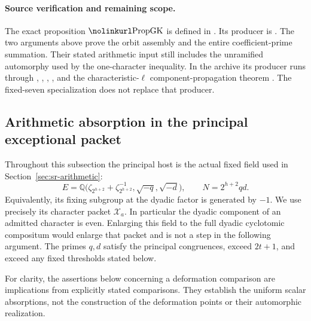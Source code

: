 \paragraph{Source verification and remaining scope.}
The exact proposition $\srcid{PropGK}$ is defined in
\href{https://github.com/ChristianKudeba/alpoge-rh-verification/blob/alpoge-source-7cbf7a0c/src/Development/AutomorphicArithmetic/AutomorphicVarieties/UnitaryThreeGroups/KatoUse.lean}
{}.
Its producer is
\href{https://github.com/ChristianKudeba/alpoge-rh-verification/blob/alpoge-source-7cbf7a0c/src/Development/AutomorphicArithmetic/AutomorphicVarieties/ModularityArgument/ThresholdArguments/DenseThresholdCases/FPropGKU.lean}
{}.
The two arguments above prove the orbit assembly and the entire
coefficient-prime summation. Their stated arithmetic input still
includes the unramified automorphy used by the one-character inequality.
In the archive its producer runs through
, ,
, , and the characteristic-$\ell$
component-propagation theorem .
The fixed-seven specialization does not replace that producer.

\subsection{Arithmetic absorption in the principal exceptional packet}
\label{sec:sr-exceptional-absorption}

Throughout this subsection the principal host is the actual fixed field
used in Section~\ref{sec:sr-arithmetic}:
\[
 E=\mathbb Q\bigl(\zeta_{2^{h+2}}+\zeta_{2^{h+2}}^{-1},
                   \sqrt{-q},\sqrt{-d}\bigr),\qquad N=2^{h+2}qd.
\]
Equivalently, its fixing subgroup at the dyadic factor is generated by
\(-1\). We use precisely its character packet \(\mathcal X_a\).
In particular the dyadic component of an admitted character is even.
Enlarging this field to the full dyadic cyclotomic compositum would
enlarge that packet and is not a step in the following argument.
The primes \(q,d\) satisfy the principal congruences, exceed \(2t+1\),
and exceed any fixed thresholds stated below.

For clarity, the assertions below concerning a deformation comparison
are implications from explicitly stated comparisons. They establish the
uniform scalar absorptions, not the construction of the deformation
points or their automorphic realization.


